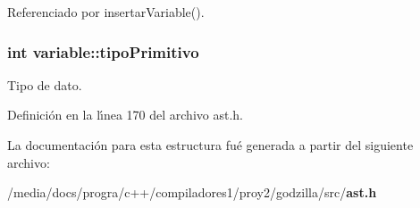 Referenciado por insertar\-Variable().
\subsubsection{\setlength{\rightskip}{0pt plus 5cm}int {\bf variable::tipo\-Primitivo}}\label{structvariable_o0}


Tipo de dato. 



Definici\'{o}n en la l\'{\i}nea 170 del archivo ast.h.

La documentaci\'{o}n para esta estructura fu\'{e} generada a partir del siguiente archivo:\begin{CompactItemize}
\item 
/media/docs/progra/c++/compiladores1/proy2/godzilla/src/{\bf ast.h}\end{CompactItemize}
